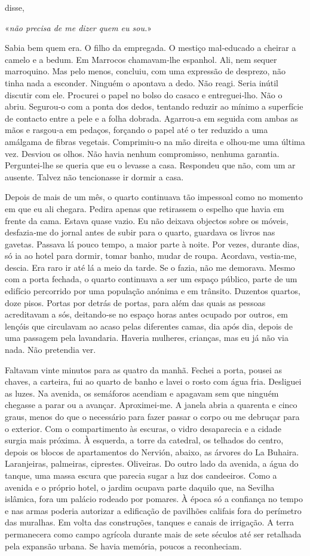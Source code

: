 disse,

«\emph{não precisa de me dizer quem eu sou.}»

Sabia bem quem era. O filho da empregada. O mestiço mal­‑educado a
cheirar a camelo e a bedum. Em Marrocos chamavam­‑lhe espanhol. Ali, nem
sequer marroquino. Mas pelo menos, concluiu, com uma expressão de
desprezo, não tinha nada a esconder. Ninguém o apontava a dedo. Não
reagi. Seria inútil discutir com ele. Procurei o papel no bolso do
casaco e entreguei­‑lho. Não o abriu. Segurou­‑o com a ponta dos dedos,
tentando reduzir ao mínimo a superfície de contacto entre a pele e a
folha dobrada. Agarrou­‑a em seguida com ambas as mãos e rasgou­‑a em
pedaços, forçando o papel até o ter reduzido a uma amálgama de fibras
vegetais. Comprimiu­‑o na mão direita e olhou­‑me uma última vez.
Desviou os olhos. Não havia nenhum compromisso, nenhuma garantia.
Perguntei­‑lhe se queria que eu o levasse a casa. Respondeu que não, com
um ar ausente. Talvez não tencionasse ir dormir a casa.

Depois de mais de um mês, o quarto continuava tão impessoal como no
momento em que eu ali chegara. Pedira apenas que retirassem o espelho
que havia em frente da cama. Estava quase vazio. Eu não deixava objectos
sobre os móveis, desfazia­‑me do jornal antes de subir para o quarto,
guardava os livros nas gavetas. Passava lá pouco tempo, a maior parte à
noite. Por vezes, durante dias, só ia ao hotel para dormir, tomar banho,
mudar de roupa. Acordava, vestia­‑me, descia. Era raro ir até lá a meio
da tarde. Se o fazia, não me demorava. Mesmo com a porta fechada, o
quarto continuava a ser um espaço público, parte de um edifício
percorrido por uma população anónima e em trânsito. Duzentos quartos,
doze pisos. Portas por detrás de portas, para além das quais as pessoas
acreditavam a sós, deitando­‑se no espaço horas antes ocupado por
outros, em lençóis que circulavam ao acaso pelas diferentes camas, dia
após dia, depois de uma passagem pela lavandaria. Haveria mulheres,
crianças, mas eu já não via nada. Não pretendia ver.

Faltavam vinte minutos para as quatro da manhã. Fechei a porta, pousei
as chaves, a carteira, fui ao quarto de banho e lavei o rosto com água
fria. Desliguei as luzes. Na avenida, os semáforos acendiam e apagavam
sem que ninguém chegasse a parar ou a avançar. Aproximei­‑me. A janela
abria a quarenta e cinco graus, menos do que o necessário para fazer
passar o corpo ou me debruçar para o exterior. Com o compartimento às
escuras, o vidro desaparecia e a cidade surgia mais próxima. À esquerda,
a torre da catedral, os telhados do centro, depois os blocos de
apartamentos do Nervión, abaixo, as árvores do La Buhaira. Laranjeiras,
palmeiras, ciprestes. Oliveiras. Do outro lado da avenida, a água do
tanque, uma massa escura que parecia sugar a luz dos candeeiros. Como a
avenida e o próprio hotel, o jardim ocupava parte daquilo que, na
Sevilha islâmica, fora um palácio rodeado por pomares. À época só a
confiança no tempo e nas armas poderia autorizar a edificação de
pavilhões califais fora do perímetro das muralhas. Em volta das
construções, tanques e canais de irrigação. A terra permanecera como
campo agrícola durante mais de sete séculos até ser retalhada pela
expansão urbana. Se havia memória, poucos a reconheciam.

